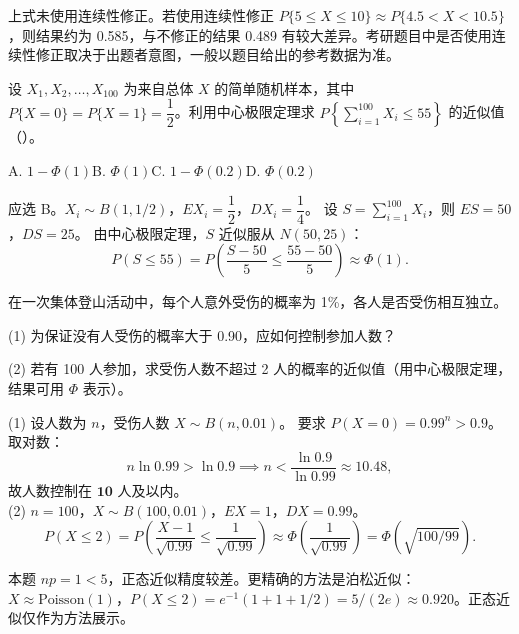 \documentclass[lang=cn,11pt]{elegantbook}
\begin{document}
\begin{note}
上式未使用连续性修正。若使用连续性修正 \(P\{5 \leq X \leq 10\} \approx P\{4.5 < X < 10.5\}\)，则结果约为 0.585，与不修正的结果 0.489 有较大差异。考研题目中是否使用连续性修正取决于出题者意图，一般以题目给出的参考数据为准。
\end{note}


\begin{exercise}\label{exer:5-clt-bernoulli-sum}
设 \(X_1, X_2, \dots, X_{100}\) 为来自总体 \(X\) 的简单随机样本，其中 \(P\{X=0\} = P\{X=1\} = \dfrac{1}{2}\)。利用中心极限定理求 \(P\!\left\{\displaystyle\sum_{i=1}^{100} X_i \leq 55\right\}\) 的近似值（\quad）。\par
A. \(1 - \Phi(1)\)\quad B. \(\Phi(1)\)\quad C. \(1 - \Phi(0.2)\)\quad D. \(\Phi(0.2)\)
\end{exercise}
\begin{solution}
应选 B。\(X_i \sim B(1, 1/2)\)，\(EX_i = \dfrac{1}{2}\)，\(DX_i = \dfrac{1}{4}\)。
设 \(S = \displaystyle\sum_{i=1}^{100} X_i\)，则 \(ES = 50\)，\(DS = 25\)。
由中心极限定理，\(S\) 近似服从 \(N(50, 25)\)：
\[
P(S \leq 55) = P\!\left(\frac{S - 50}{5} \leq \frac{55 - 50}{5}\right) \approx \Phi(1).
\]
\end{solution}

\begin{exercise}\label{exer:5-climb}
在一次集体登山活动中，每个人意外受伤的概率为 1\%，各人是否受伤相互独立。\par
(1) 为保证没有人受伤的概率大于 0.90，应如何控制参加人数？\par
(2) 若有 100 人参加，求受伤人数不超过 2 人的概率的近似值（用中心极限定理，结果可用 \(\Phi\) 表示）。
\end{exercise}
\begin{solution}
(1) 设人数为 \(n\)，受伤人数 \(X \sim B(n, 0.01)\)。
要求 \(P(X = 0) = 0.99^n > 0.9\)。取对数：
\[
n\ln 0.99 > \ln 0.9 \implies n < \frac{\ln 0.9}{\ln 0.99} \approx 10.48,
\]
故人数控制在 \(\mathbf{10}\) 人及以内。\\
(2) \(n = 100\)，\(X \sim B(100, 0.01)\)，\(EX = 1\)，\(DX = 0.99\)。
\[
P(X \leq 2) = P\!\left(\frac{X-1}{\sqrt{0.99}} \leq \frac{1}{\sqrt{0.99}}\right) \approx \Phi\!\left(\frac{1}{\sqrt{0.99}}\right) = \Phi(\sqrt{100/99}).
\]
\begin{note}
本题 \(np = 1 < 5\)，正态近似精度较差。更精确的方法是泊松近似：\(X \approx \text{Poisson}(1)\)，\(P(X \leq 2) = e^{-1}(1+1+1/2) = 5/(2e) \approx 0.920\)。正态近似仅作为方法展示。
\end{note}
\end{solution}
\end{document}
